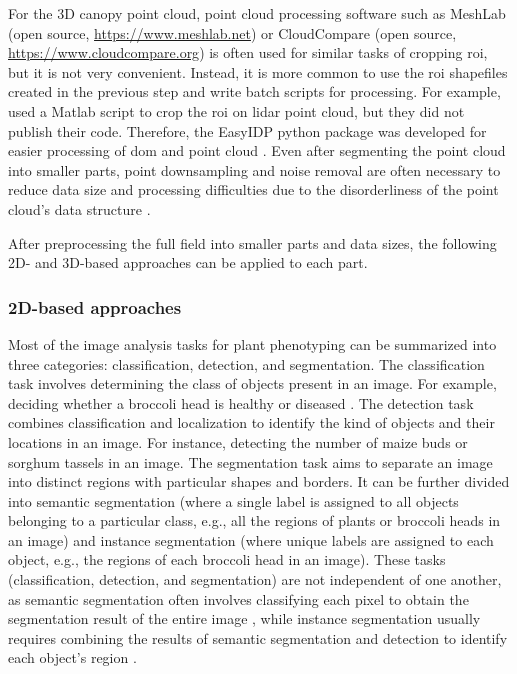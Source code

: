 For the 3D canopy point cloud, point cloud processing software such as MeshLab (open source, \url{https://www.meshlab.net}) or CloudCompare (open source, \url{https://www.cloudcompare.org}) is often used for similar tasks of cropping \gls{roi}, but it is not very convenient. Instead, it is more common to use the \gls{roi} shapefiles created in the previous step and write batch scripts for processing. For example, \citet{sun_field_2018} used a Matlab script to crop the \gls{roi} on \gls{lidar} point cloud, but they did not publish their code. Therefore, the EasyIDP python package was developed for easier processing of \gls{dom} and point cloud \citep{wang_easyidp_2021}. Even after segmenting the point cloud into smaller parts, point downsampling and noise removal are often necessary to reduce data size and processing difficulties due to the disorderliness of the point cloud's data structure \citep{ma_calculation_2019}.

After preprocessing the full field into smaller parts and data sizes, the following 2D- and 3D-based approaches can be applied to each part.

\subsubsection{2D-based approaches}

Most of the image analysis tasks for plant phenotyping can be summarized into three categories: classification, detection, and segmentation. The classification task involves determining the class of objects present in an image. For example, deciding whether a broccoli head is healthy or diseased \citep{garcia_towards_2021}. The detection task combines classification and localization to identify the kind of objects and their locations in an image. For instance, detecting the number of maize buds \citep{liu_estimating_2022} or sorghum tassels \citep{ghosal_weakly_2019} in an image. The segmentation task aims to separate an image into distinct regions with particular shapes and borders. It can be further divided into semantic segmentation (where a single label is assigned to all objects belonging to a particular class, e.g., all the regions of plants or broccoli heads in an image) and instance segmentation (where unique labels are assigned to each object, e.g., the regions of each broccoli head in an image). These tasks (classification, detection, and segmentation) are not independent of one another, as semantic segmentation often involves classifying each pixel to obtain the segmentation result of the entire image \citep{guo_easypcc_2017}, while instance segmentation usually requires combining the results of semantic segmentation and detection to identify each object's region \citep[see Fig.~2]{luling_using_2021}.

